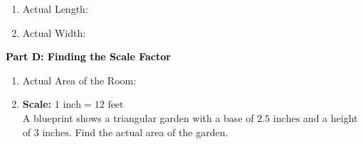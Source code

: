 \documentclass[12pt, letterpaper, fleqn]{article}
\newcommand{\blank}{\underline{\hspace{2.2cm}}}
\begin{document}
\vspace{3mm}

\begin{enumerate}[itemsep=2.5cm, leftmargin=0.6cm, resume]
\item Actual Length: \blank
\item Actual Width: \blank
\end{enumerate}

\newpage

\begin{tcolorbox}[colback=customteal!20]
\large\textcolor{black}{\textbf{Part D: Finding the Scale Factor}}
\end{tcolorbox}

\vspace{3mm}

\begin{enumerate}[itemsep=2.5cm, leftmargin=0.6cm, resume]
\item Actual Area of the Room: \blank
\item \textbf{Scale:} $1\text{ inch} = 12\text{ feet}$ \\
A blueprint shows a triangular garden with a base of $2.5\text{ inches}$ and a height of $3\text{ inches}$. Find the actual area of the garden.
\end{enumerate}
\end{document}
